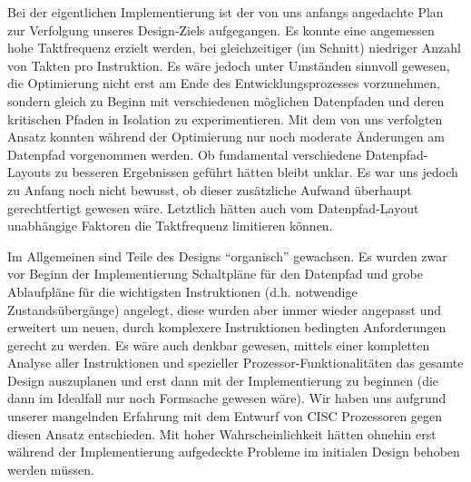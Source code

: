 \documentclass[ngerman, cd=lightcolor]{tudscrreprt}
\begin{document}
Bei der eigentlichen Implementierung ist der von uns anfangs angedachte Plan
zur Verfolgung unseres Design-Ziels aufgegangen. Es konnte eine angemessen hohe
Taktfrequenz erzielt werden, bei gleichzeitiger (im Schnitt) niedriger Anzahl
von Takten pro Instruktion. Es wäre jedoch unter Umständen sinnvoll gewesen,
die Optimierung nicht erst am Ende des Entwicklungsprozesses vorzunehmen,
sondern gleich zu Beginn mit verschiedenen möglichen Datenpfaden und deren
kritischen Pfaden in Isolation zu experimentieren. Mit dem von uns verfolgten
Ansatz konnten während der Optimierung nur noch moderate Änderungen am
Datenpfad vorgenommen werden.  Ob fundamental verschiedene Datenpfad-Layouts zu
besseren Ergebnissen geführt hätten bleibt unklar. Es war uns jedoch zu Anfang
noch nicht bewusst, ob dieser zusätzliche Aufwand überhaupt gerechtfertigt
gewesen wäre. Letztlich hätten auch vom Datenpfad-Layout unabhängige Faktoren
die Taktfrequenz limitieren können.

Im Allgemeinen sind Teile des Designs ``organisch'' gewachsen. Es wurden zwar
vor Beginn der Implementierung Schaltpläne für den Datenpfad und grobe
Ablaufpläne für die wichtigsten Instruktionen (d.h. notwendige
Zustandsübergänge) angelegt, diese wurden aber immer wieder angepasst und
erweitert um neuen, durch komplexere Instruktionen bedingten Anforderungen
gerecht zu werden. Es wäre auch denkbar gewesen, mittels einer kompletten
Analyse aller Instruktionen und spezieller Prozessor-Funktionalitäten das
gesamte Design auszuplanen und erst dann mit der Implementierung zu beginnen
(die dann im Idealfall nur noch Formsache gewesen wäre). Wir haben uns aufgrund
unserer mangelnden Erfahrung mit dem Entwurf von CISC Prozessoren gegen diesen
Ansatz entschieden. Mit hoher Wahrscheinlichkeit hätten ohnehin erst während
der Implementierung aufgedeckte Probleme im initialen Design behoben werden
müssen.

\headingsvskip=-120pt

\clearpage
\begingroup
  \let\clearpage\relax
  \listoffigures
\endgroup
\end{document}
